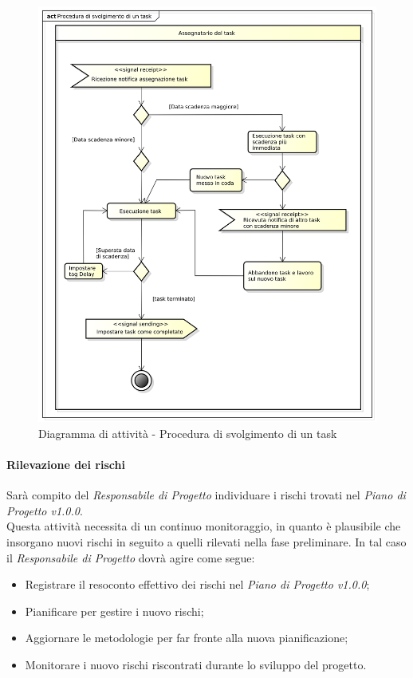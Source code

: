 \begin{figure}[htbp]
\centering
\includegraphics[scale=0.5]{png/Procedura_di svolgimento_di_un_task.png}
\captionsetup{labelfont=bf}
\caption{Diagramma di attività - Procedura di svolgimento di un task}

\end{figure}

\paragraph{Rilevazione dei rischi}
Sarà compito del \textit{Responsabile di Progetto} individuare i rischi trovati nel \textit{Piano di Progetto v1.0.0}.\\
Questa attività necessita di un continuo monitoraggio, in quanto è plausibile che insorgano nuovi rischi in seguito a quelli rilevati nella fase preliminare. In tal caso il \textit{Responsabile di Progetto} dovrà agire come segue:
\begin{itemize}
\item Registrare il resoconto effettivo dei rischi nel \textit{Piano di Progetto v1.0.0};
\item Pianificare per gestire i nuovo rischi;
\item Aggiornare le metodologie per far fronte alla nuova pianificazione;
\item Monitorare i nuovo rischi riscontrati durante lo sviluppo del progetto. 
\end{itemize}

